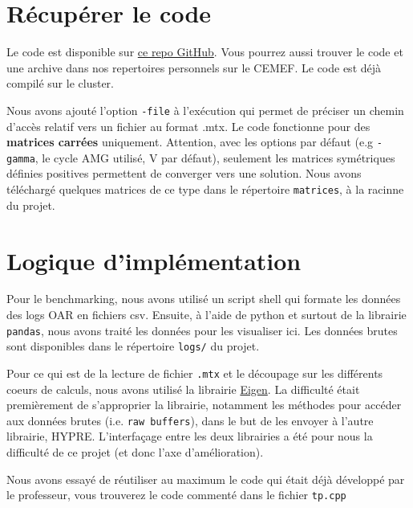 \documentclass[10pt,twocolumn,letterpaper]{article}
\def\code#1{\texttt{#1}}
\begin{document}
\section{Récupérer le code}
Le code est disponible sur
\href{https://github.com/Aympab/HypreBoomerAMG_Benchmark}{ce repo GitHub}.
Vous pourrez aussi trouver le code et une archive dans nos repertoires
personnels sur le CEMEF. Le code est déjà compilé sur le cluster.

Nous avons ajouté l'option \code{-file} à l'exécution qui permet de préciser
un chemin d'accès relatif vers un fichier au format .mtx. Le code fonctionne
pour des \textbf{matrices carrées} uniquement. Attention, avec les options par 
défaut (e.g \code{-gamma}, le cycle AMG utilisé, V par défaut), seulement les
matrices symétriques définies positives permettent de converger vers une
solution. Nous avons téléchargé quelques matrices de ce type dans le répertoire
\code{matrices}, à la racinne du projet.

\section{Logique d'implémentation}

Pour le benchmarking, nous avons utilisé un script shell qui formate les données
des logs OAR en fichiers csv.
Ensuite, à l'aide de python et surtout de la librairie \code{pandas}, nous avons
traité les données pour les visualiser ici.
Les données brutes sont disponibles dans le répertoire \code{logs/} du projet.

Pour ce qui est de la lecture de fichier \code{.mtx} et le découpage sur les
différents coeurs de calculs, nous avons utilisé la librairie
\href{https://eigen.tuxfamily.org/index.php?title=Main_Page}{Eigen}.
La difficulté était premièrement de s'approprier la librairie, notamment les
méthodes pour accéder aux données brutes (i.e. \code{raw buffers}), dans le but
de les envoyer à l'autre librairie, HYPRE. L'interfaçage entre les deux
librairies a été pour nous la difficulté de ce projet (et donc l'axe
d'amélioration).

Nous avons essayé de réutiliser au maximum le code qui était déjà développé par
le professeur, vous trouverez le code commenté dans le fichier \code{tp.cpp}
\end{document}
